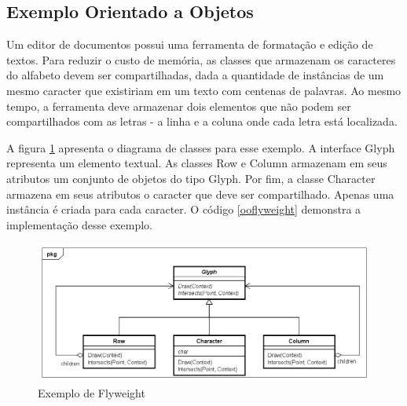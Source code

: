 \subsection*{Exemplo Orientado a Objetos}

Um editor de documentos possui uma ferramenta 
de formatação e edição de textos. Para reduzir o 
custo de memória, as classes que armazenam os 
caracteres do alfabeto devem ser compartilhadas, 
dada a quantidade de instâncias de um mesmo caracter 
que existiriam em um texto com centenas de palavras. 
Ao mesmo tempo, a ferramenta deve armazenar dois 
elementos que não podem ser compartilhados com as 
letras - a linha e a coluna onde cada letra está 
localizada. 

A figura \ref{flyweight_exemplo} apresenta o diagrama 
de classes para esse exemplo. A interface Glyph 
representa um elemento textual. As classes Row e 
Column armazenam em seus atributos um conjunto de objetos 
do tipo Glyph. 
Por fim, a classe Character armazena em seus atributos 
o caracter que deve ser compartilhado. Apenas uma 
instância é criada para cada caracter. O 
código \ref{ooflyweight} demonstra a implementação 
desse exemplo.

\begin{figure}[htb]
	\caption{\label{flyweight_exemplo}Exemplo de Flyweight}
	\begin{center}
	    \includegraphics[scale=0.5]{5_padroes-contexto-funcional/5.2_estruturais/5.2.6_flyweight/flyweight_exemplo.png}
	\end{center}
\end{figure}

